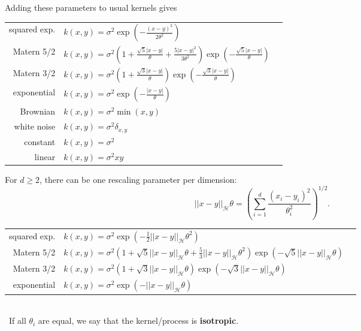 \documentclass{beamer}
\newcommand\N[1]{{|| #1 ||}_\mathcal{H}}
\begin{document}

\begin{frame}{}
Adding these parameters to usual kernels gives\\
\vspace{2mm}
\footnotesize
\begin{tabular}{rlN}
		squared exp. & $\displaystyle k(x,y) = \sigma^2 \exp \left(- \frac{(x-y)^2}{2 \theta^2} \right)$ &\\[6mm]
		Matern 5/2 & $\displaystyle k(x,y) = \sigma^2 \left(1 + \frac{\sqrt{5}|x-y|}{\theta} + \frac{5|x-y|^2}{3 \theta^2} \right) \exp \left(- \frac{\sqrt{5}|x-y|}{\theta} \right)$ &\\[6mm]
		Matern 3/2 & $\displaystyle k(x,y) = \sigma^2 \left(1 + \frac{\sqrt{3}|x-y|}{\theta} \right) \exp \left(- \frac{\sqrt{3}|x-y|}{\theta} \right)$ &\\[6mm]
		exponential & $\displaystyle k(x,y) = \sigma^2 \exp \left(- \frac{|x-y|}{\theta} \right)$ &\\[6mm]
		Brownian & $ \displaystyle k(x,y) = \sigma^2 \min (x,y) $ &\\[6mm]
		white noise & $ \displaystyle k(x,y) = \sigma^2 \delta_{x,y} $ &\\[6mm]
		constant & $ \displaystyle k(x,y) = \sigma^2 $ &\\[6mm]
		linear & $ \displaystyle k(x,y) = \sigma^2 xy $ &\\[6mm]
\end{tabular}
\end{frame}

\begin{frame}{}
For $d \geq 2$, there can be one rescaling parameter per dimension:
\begin{equation*}
	\N{x-y}{\theta} = \left( \sum_{i=1}^d \frac{(x_i-y_i)^2}{\theta_i^2} \right)^{1/2}.
\end{equation*}
\vspace{2mm}
\footnotesize
\begin{tabular}{rlN}
        squared exp. & $\displaystyle k(x,y) = \sigma^2 \exp \left(- \frac12 \N{x-y}{\theta}^2 \right)$ &\\[6mm]
        Matern 5/2 & $\displaystyle k(x,y) = \sigma^2 \left(1 + \sqrt{5}\N{x-y}{\theta} + \frac{5}{3}\N{x-y}{\theta}^2 \right) \exp \left(- \sqrt{5}\N{x-y}{\theta} \right)$ &\\[6mm]
        Matern 3/2 & $\displaystyle k(x,y) = \sigma^2 \left(1 + \sqrt{3}\N{x-y}{\theta} \right) \exp \left(- \sqrt{3}\N{x-y}{\theta}  \right)$ &\\[6mm]
        exponential & $\displaystyle k(x,y) = \sigma^2 \exp \left(- \N{x-y}{\theta} \right)$ 
\end{tabular}
\normalsize
\\ \vspace{5mm} \
If all $\theta_i$ are equal, we say that the kernel/process is \textbf{isotropic}.
\end{frame}
\end{document}
